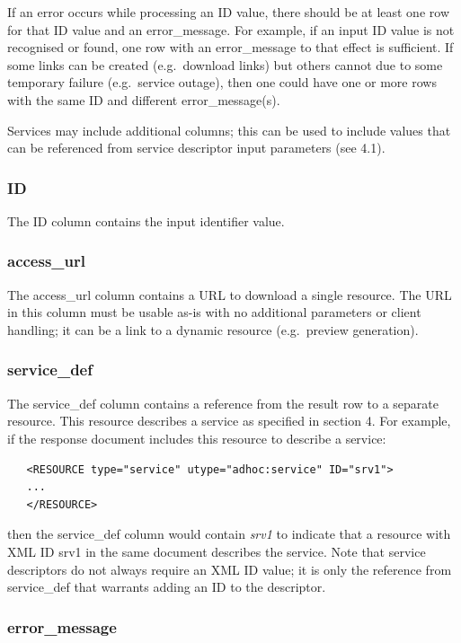\documentclass[11pt,a4paper]{ivoa}
\begin{document}
If an error occurs while processing an ID value, there should be at least
one row for that ID value and an error\_message. For example, if an input
ID value is not recognised or found, one row with an error\_message
to that effect is sufficient.
If some links can be created (e.g.\ download links)
but others cannot due to some temporary failure (e.g.\ service outage),
then one could have one or more rows with the same ID and different
error\_message(s).

Services may include additional columns; this can be used to include
values that can be referenced from service descriptor input parameters
(see 4.1).


\subsubsection{ID}

The ID column contains the input identifier value.


\subsubsection{access\_url}

The access\_url column contains a URL to download a single resource.
The URL in this column must be usable as-is with no additional
parameters or client handling; it can be a link to a dynamic
resource (e.g.\ preview generation).


\subsubsection{service\_def}

The service\_def column contains a reference from the result row to
a separate resource. This resource describes a service as specified
in section 4.
For example, if the response document includes this resource
to describe a service:
\begin{verbatim}
   <RESOURCE type="service" utype="adhoc:service" ID="srv1">
   ...
   </RESOURCE>
\end{verbatim}
then the service\_def column would contain {\em srv1\/} to indicate that
a resource with XML ID srv1 in the same document describes the service.
Note that service descriptors do not always require an XML ID value;
it is only the reference from service\_def that warrants adding
an ID to the descriptor.


\subsubsection{error\_message}
\end{document}
